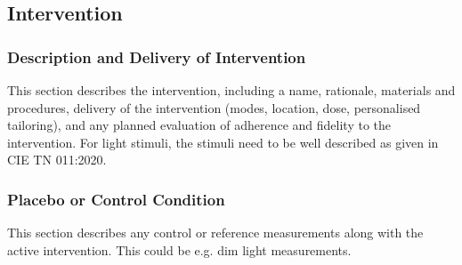 \subsection{Intervention}

\subsubsection{Description and Delivery of Intervention}
\begin{prereg}
\begin{instruction}
This section describes the intervention, including a name, rationale, materials and procedures, delivery of the intervention (modes, location, dose, personalised tailoring), and any planned evaluation of adherence and fidelity to the intervention. For light stimuli, the stimuli need to be well described as given in CIE TN 011:2020.
\end{instruction}
\end{prereg}

\subsubsection{Placebo or Control Condition}
\begin{prereg}
\begin{instruction}
This section describes any control or reference measurements along with the active intervention. This could be e.g. dim light measurements.
\end{instruction}
\end{prereg}

